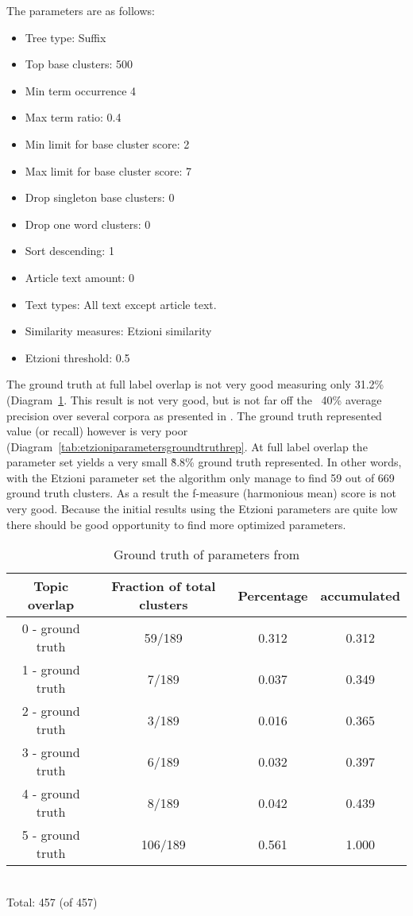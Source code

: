 The parameters are as follows:
\begin{itemize}
  \item Tree type: Suffix
  \item Top base clusters: 500
  \item Min term occurrence 4
  \item Max term ratio: 0.4
  \item Min limit for base cluster score: 2
  \item Max limit for base cluster score: 7
  \item Drop singleton base clusters: 0
  \item Drop one word clusters: 0
  \item Sort descending: 1
  \item Article text amount: 0
  \item Text types: All text except article text.
  \item Similarity measures: Etzioni similarity
  \item Etzioni threshold: 0.5
\end{itemize}

The ground truth at full label overlap is not very good measuring only 31.2\% (Diagram~\ref{tab:etzioniparametersgroundtruth}. This result is not very good, but is not far off the ~40\% average precision over several corpora as presented in \cite{Oren1998}. The ground truth represented value (or recall) however is very poor (Diagram~\ref{tab:etzioniparametersgroundtruthrep}. At full label overlap the parameter set yields a very small \~8.8\% ground truth represented. In other words, with the Etzioni parameter set the algorithm only manage to find 59 out of 669 ground truth clusters. As a result the f-measure (harmonious mean) score is not very good. Because the initial results using the Etzioni parameters are quite low there should be good opportunity to find more optimized parameters.

\begin{table}
\begin{center}
\begin{tabular}{|c|c|c|c|}
\hline
Topic overlap &  Fraction of total clusters & Percentage  & accumulated\\ 
\hline
0 - ground truth & 59/189  & 0.312 & 0.312\\
1 - ground truth &  7/189  & 0.037 & 0.349\\
2 - ground truth &  3/189  & 0.016 & 0.365\\
3 - ground truth &  6/189  & 0.032 & 0.397\\
4 - ground truth &  8/189  & 0.042 & 0.439\\
5 - ground truth & 106/189 & 0.561 & 1.000\\
\hline
\end{tabular}
\\Total: 457 (of  457)
\end{center}
\caption{Ground truth of parameters from \citeauthor{Oren1998}}
\label{tab:etzioniparametersgroundtruth}
\end{table}


